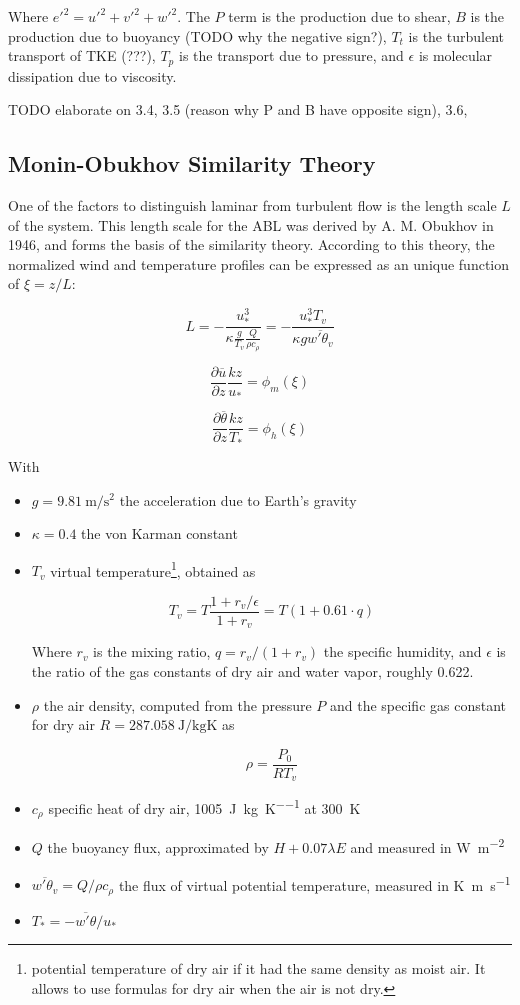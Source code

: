 \documentclass[12pt]{book}
\begin{document}
Where ${e'}^2={u'}^2+{v'}^2+{w'}^2$. The $P$ term is the production due to shear, $B$ is the production due to buoyancy (TODO why the negative sign?), $T_t$ is the turbulent transport of TKE (???), $T_p$ is the transport due to pressure, and $\epsilon$ is molecular dissipation due to viscosity.

TODO elaborate on 3.4, 3.5 (reason why P and B have opposite sign), 3.6, 

\subsection{Monin-Obukhov Similarity Theory}
One of the factors to distinguish laminar from turbulent flow is the length scale $L$ of the system. This length scale for the ABL was derived by A. M. Obukhov in 1946, and forms the basis of the similarity theory. According to this theory, the normalized wind and temperature profiles can be expressed as an unique function of $\xi=z/L$:

$$
L=-\frac{u_*^3}{\kappa\frac{g}{T_v}\frac{Q}{\rho c_\rho}}
=-\frac{u_*^3 T_v}{\kappa g \overline{w'\theta_v}}
$$

$$
\frac{\partial\overline{u}}{\partial z}\frac{kz}{u_*}=\phi_m(\xi)
$$

$$
\frac{\partial\overline{\theta}}{\partial z}\frac{kz}{T_*}=\phi_h(\xi)
$$

With

\begin{itemize}
\item $g=\SI{9.81}{\meter\per\square\second}$ the acceleration due to Earth's gravity
\item $\kappa=0.4$ the von Karman constant

\item $T_v$ virtual temperature\footnote{potential temperature of dry air if it had the same density as moist air. It allows to use formulas for dry air when the air is not dry.}, obtained as

$$
T_v=T\frac{1+r_v/\epsilon}{1+r_v}=T(1+0.61\cdot q)
$$

Where $r_v$ is the mixing ratio, $q=r_v/(1+r_v)$ the specific humidity, and $\epsilon$ is the ratio of the gas constants of dry air and water vapor, roughly 0.622.

\item $\rho$ the air density, computed from the pressure $P$ and the specific gas constant for dry air $R=\SI{287.058}{\joule\per\kilo\gram\kelvin}$ as

$$
\rho=\frac{P_0}{RT_v}
$$


\item $c_\rho$ specific heat of dry air, \SI{1005}{\joule\per\kilo\gram\per\kelvin} at \SI{300}{\kelvin}
\item $Q$ the buoyancy flux, approximated by $H+0.07\lambda E$ and measured in \si{\watt\per\square\meter}
\item $\overline{w'\theta_v}=Q/\rho c_\rho$ the flux of virtual potential temperature, measured in \si{\kelvin\meter\per\second}
\item $T_*=-\overline{w'\theta}/u_*$
\end{itemize}
\end{document}
